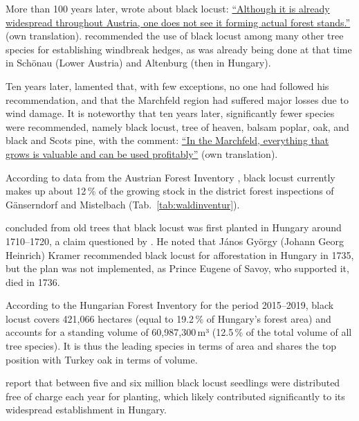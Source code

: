 More than 100 years later, \citet[p.~339]{Feistmantel1835dieForstwissenschaft} wrote about black locust: \hyperlink{german:Feistmantel1835dieForstwissenschaft}{\enquote{Although it is already widespread throughout Austria, one does not see it forming actual forest stands.}} (own translation). \citet{hofmann1851baumloseEbenen} recommended the use of black locust among many other tree species for establishing windbreak hedges, as was already being done at that time in Schönau (Lower Austria) and Altenburg (then in Hungary).

Ten years later, \citet{hofmann1861waldbaumCulturWarchfelde} lamented that, with few exceptions, no one had followed his recommendation, and that the Marchfeld region had suffered major losses due to wind damage. It is noteworthy that ten years later, significantly fewer species were recommended, namely black locust, tree of heaven, balsam poplar, oak, and black and Scots pine, with the comment: \hyperlink{german:hofmann1861waldbaumCulturWarchfelde}{\enquote{In the Marchfeld, everything that grows is valuable and can be used profitably}} (own translation).

According to data from the Austrian Forest Inventory \citep{bfw2025waldinventurWeb}, black locust currently makes up about 12\,\% of the growing stock in the district forest inspections of Gänserndorf and Mistelbach (Tab.~\ref{tab:waldinventur}).


\citet[p.~3]{vadas1911robinie} concluded from old trees that black locust was first planted in Hungary around 1710–1720, a claim questioned by \citet[p.~179]{ernyey1926robinie}. He noted that János György (Johann Georg Heinrich) Kramer recommended black locust for afforestation in Hungary in 1735, but the plan was not implemented, as Prince Eugene of Savoy, who supported it, died in 1736.

According to the Hungarian Forest Inventory \citep{waldinventur20152019ungarn} for the period 2015–2019, black locust covers 421,066 hectares (equal to 19.2\,\% of Hungary's forest area) and accounts for a standing volume of 60,987,300\,m³ (12.5\,\% of the total volume of all tree species). It is thus the leading species in terms of area and shares the top position with Turkey oak in terms of volume.

\citet{bund1899robinie,gaskil1906robinie} report that between five and six million black locust seedlings were distributed free of charge each year for planting, which likely contributed significantly to its widespread establishment in Hungary.


